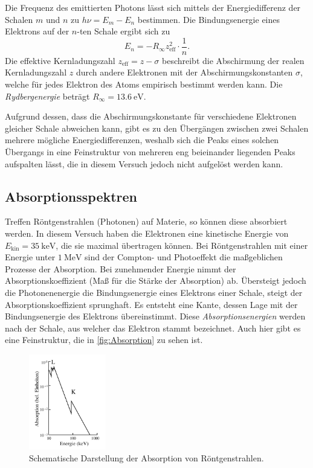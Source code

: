 Die Frequenz des emittierten Photons lässt sich mittels der Energiedifferenz der Schalen $m$ und $n$ zu $h \nu = E_m - E_n$ bestimmen. 
Die Bindungsenergie eines Elektrons auf der $n$-ten Schale ergibt sich zu 
\begin{equation}
    \label{eqn:Bindungsenergie}
    E_n = -R_\infty z^2_\text{eff} \cdot \frac{1}{n}.
\end{equation}
Die effektive Kernladungszahl $z_\text{eff} = z - \sigma$ beschreibt die Abschirmung der realen Kernladungszahl $z$ durch andere Elektronen mit der 
Abschirmungskonstanten $\sigma$, welche für jedes Elektron des Atoms empirisch bestimmt werden kann. Die \textit{Rydbergenergie} beträgt 
$R_\infty = \qty{13.6}{\electronvolt}$.  

Aufgrund dessen, dass die Abschirmungskonstante für verschiedene Elektronen gleicher Schale abweichen kann, gibt es zu den Übergängen zwischen zwei Schalen
mehrere mögliche Energiedifferenzen, weshalb sich die Peaks eines solchen Übergangs in eine Feinstruktur von mehreren eng beieinander liegenden Peaks
aufspalten lässt, die in diesem Versuch jedoch nicht aufgelöst werden kann.

\subsection{Absorptionsspektren}
\label{subsec:Absorption}
Treffen Röntgenstrahlen (Photonen) auf Materie, so können diese absorbiert werden.
In diesem Versuch haben die Elektronen eine kinetische Energie von $E_\text{kin} = \qty{35}{\kilo\electronvolt}$, die sie maximal übertragen können. 
Bei Röntgenstrahlen mit einer Energie unter $\qty{1}{\mega\electronvolt}$ sind der Compton- und Photoeffekt die maßgeblichen Prozesse der Absorption.
Bei zunehmender Energie nimmt der Absorptionskoeffizient (Maß für die Stärke der Absorption) ab. Übersteigt jedoch die Photonenenergie die Bindungsenergie
eines Elektrons einer Schale, steigt der Absorptionskoeffizient sprunghaft. Es entsteht eine \glqq Kante\grqq{}, dessen Lage mit der Bindungsenergie des
Elektrons übereinstimmt. Diese \textit{Absorptionsenergien} werden nach der Schale, aus welcher das Elektron stammt bezeichnet. Auch hier gibt es eine
Feinstruktur, die in \autoref{fig:Absorption} zu sehen ist.

\begin{figure}
    \centering
    \includegraphics[width = 0.3\textwidth]{content/Absorption.png}
    \caption{Schematische Darstellung der Absorption von Röntgenstrahlen. \cite{v602}}
    \label{fig:Absorption}
\end{figure}

